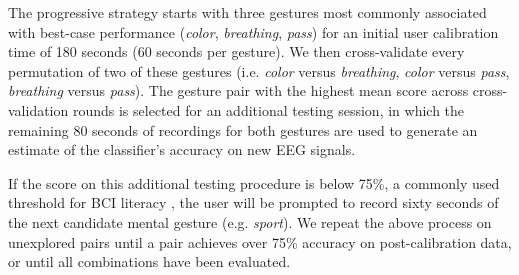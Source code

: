 The progressive strategy starts with three gestures most commonly associated with best-case performance (\textit{color}, \textit{breathing}, \textit{pass}) for an initial user calibration time of 180 seconds (60 seconds per gesture). We then cross-validate every permutation of two of these gestures (i.e. \textit{color} versus \textit{breathing}, \textit{color} versus \textit{pass}, \textit{breathing} versus \textit{pass}). The gesture pair with the highest mean score across cross-validation rounds is selected for an additional testing session, in which the remaining 80 seconds of recordings for both gestures are used to generate an estimate of the classifier's accuracy on new EEG signals.

If the score on this additional testing procedure is below 75\%, a commonly used threshold for BCI literacy \cite{vidaurre_towards_2010}, the user will be prompted to record sixty seconds of the next candidate mental gesture (e.g. \textit{sport}). We repeat the above process on unexplored pairs until a pair achieves over 75\% accuracy on post-calibration data, or until all combinations have been evaluated.

